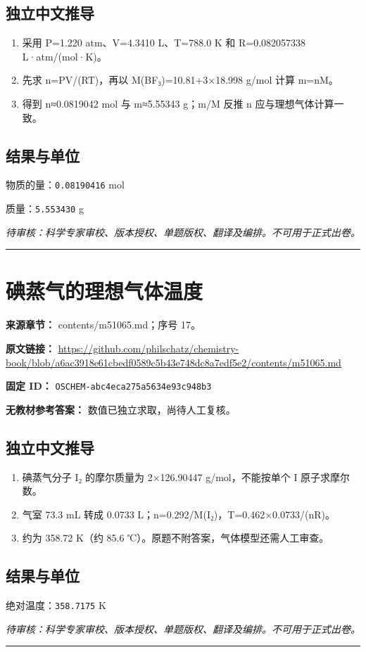 \documentclass[UTF8,11pt,oneside,openany,fontset=none]{ctexbook}
\begin{document}
\subsection*{独立中文推导}
\begin{enumerate}
\item 采用 P=1.220 atm、V=4.3410 L、T=788.0 K 和 R=0.082057338 L·atm/(mol·K)。
\item 先求 n=PV/(RT)，再以 M(BF₃)=10.81+3×18.998 g/mol 计算 m=nM。
\item 得到 n≈0.0819042 mol 与 m≈5.55343 g；m/M 反推 n 应与理想气体计算一致。
\end{enumerate}
\subsection*{结果与单位}
\noindent 物质的量：\texttt{0.08190416} mol\par
\noindent 质量：\texttt{5.553430} g\par
\noindent\textit{待审核：科学专家审校、版本授权、单题版权、翻译及编排。不可用于正式出卷。}
\medskip\hrule\medskip
\section{碘蒸气的理想气体温度}
\noindent\textbf{来源章节：} contents/m51065.md；序号 17。\par
\noindent\textbf{原文链接：} \url{https://github.com/philschatz/chemistry-book/blob/a6ac3918e61cbedf0589c5b43e748dc8a7edf5e2/contents/m51065.md}\par
\noindent\textbf{固定 ID：} \texttt{OSCHEM-abc4eca275a5634e93c948b3}\par
\textbf{无教材参考答案：} 数值已独立求取，尚待人工复核。\par
\subsection*{独立中文推导}
\begin{enumerate}
\item 碘蒸气分子 I₂ 的摩尔质量为 2×126.90447 g/mol，不能按单个 I 原子求摩尔数。
\item 气室 73.3 mL 转成 0.0733 L；n=0.292/M(I₂)，T=0.462×0.0733/(nR)。
\item 约为 358.72 K（约 85.6 ℃）。原题不附答案，气体模型还需人工审查。
\end{enumerate}
\subsection*{结果与单位}
\noindent 绝对温度：\texttt{358.7175} K\par
\noindent\textit{待审核：科学专家审校、版本授权、单题版权、翻译及编排。不可用于正式出卷。}
\medskip\hrule\medskip
\end{document}
